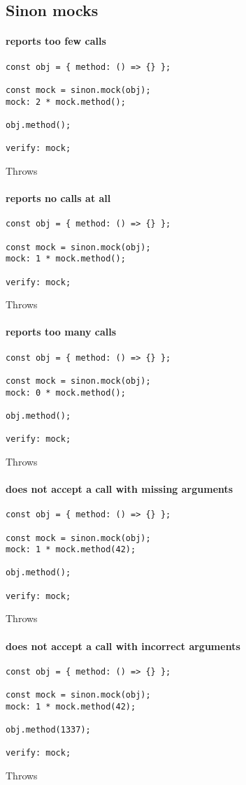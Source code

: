 \subsection*{Sinon mocks}

\paragraph*{reports too few calls}
\begin{verbatim}
const obj = { method: () => {} };

const mock = sinon.mock(obj);
mock: 2 * mock.method();

obj.method();

verify: mock;
\end{verbatim}
Throws
\paragraph*{reports no calls at all}
\begin{verbatim}
const obj = { method: () => {} };

const mock = sinon.mock(obj);
mock: 1 * mock.method();

verify: mock;
\end{verbatim}
Throws
\paragraph*{reports too many calls}
\begin{verbatim}
const obj = { method: () => {} };

const mock = sinon.mock(obj);
mock: 0 * mock.method();

obj.method();

verify: mock;
\end{verbatim}
Throws
\paragraph*{does not accept a call with missing arguments}
\begin{verbatim}
const obj = { method: () => {} };

const mock = sinon.mock(obj);
mock: 1 * mock.method(42);

obj.method();

verify: mock;
\end{verbatim}
Throws
\paragraph*{does not accept a call with incorrect arguments}
\begin{verbatim}
const obj = { method: () => {} };

const mock = sinon.mock(obj);
mock: 1 * mock.method(42);

obj.method(1337);

verify: mock;
\end{verbatim}
Throws
